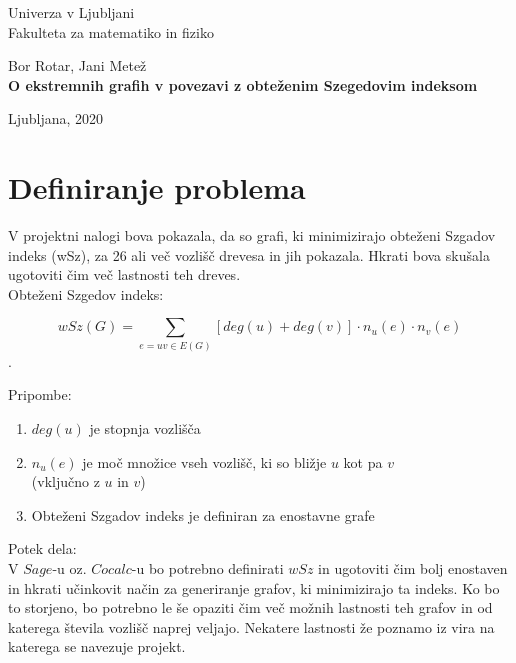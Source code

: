 \documentclass[12pt, a4paper]{article}
\begin{document}
\begin{titlepage}
\begin{center}

\large
Univerza v Ljubljani\\
\normalsize
Fakulteta za matematiko in fiziko\\

\vspace{3 cm} 

\large
Bor Rotar, Jani Metež\\

\vspace{3 cm}
\LARGE
\textbf{O ekstremnih grafih v povezavi z obteženim Szegedovim indeksom}

\vfill

\large Ljubljana, 2020

\end{center}
\end{titlepage}

\newpage

\section[Definiranje problema]{Definiranje problema}

V projektni nalogi bova pokazala, da so grafi, ki minimizirajo obteženi Szgadov indeks (wSz), za 26 ali več vozlišč drevesa in jih pokazala. Hkrati bova skušala ugotoviti čim več lastnosti teh dreves.\\


Obteženi Szgedov indeks:
\begin{center}
 $$wSz(G) =\sum_{e=uv \in E(G)}[deg(u)+ deg(v) ]\cdot n_{u}(e)\cdot n_{v}(e)$$.
\end{center}
\medskip
Pripombe:
\begin{enumerate}
\item $deg(u)$ je stopnja vozlišča
\item $n_{u}(e)$ je moč množice vseh vozlišč, ki so bližje $u$ kot pa $v$ \\ (vključno z $u$ in $v$)
\item Obteženi Szgadov indeks je definiran za enostavne grafe
\end{enumerate}
\medskip

\medskip
Potek dela: \\

V $Sage$-u oz. $Cocalc$-u bo potrebno definirati $wSz$ in ugotoviti čim bolj enostaven in hkrati učinkovit način za generiranje grafov, ki minimizirajo ta indeks. Ko bo to storjeno, bo potrebno le še opaziti čim več možnih lastnosti teh grafov in od katerega števila vozlišč naprej veljajo. Nekatere lastnosti že poznamo iz vira na katerega se navezuje projekt.
\end{document}

